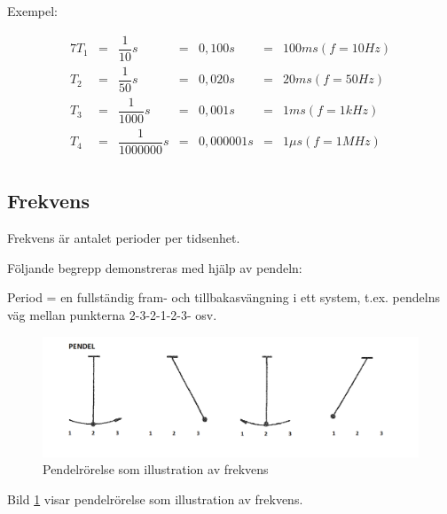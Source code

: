
Exempel:

\begin{alignat*}{7}
T_1&=&\dfrac{1}{10} \unit{s}       &=&  0,100 \unit{s}     &=& 100 ms (f = 10 \unit{Hz})\\
T_2&=&\dfrac{1}{50} \unit{s}       &=&  0,020 \unit{s}     &=& 20 ms (f = 50 \unit{Hz})\\
T_3&=&\dfrac{1}{1000} \unit{s}     &=&  0,001 \unit{s}     &=& 1 ms (f = 1 \unit{kHz})\\
T_4&=&\dfrac{1}{1000000} \unit{s}  &=&  0,000001 \unit{s}  &=& 1 \mu s (f = 1 \unit{MHz})\\
\end{alignat*}

\subsection{Frekvens}

Frekvens är antalet perioder per tidsenhet.

Följande begrepp demonstreras med hjälp av pendeln:

Period = en fullständig fram- och tillbakasvängning i ett system, t.ex.
pendelns väg mellan punkterna 2-3-2-1-2-3- osv.

\begin{figure}[ht]
	\includegraphics[width=\textwidth]{images/cropped_pdfs/bild_2_1-33.pdf}
	\caption{Pendelrörelse som illustration av frekvens}
	\label{fig:BildII1-33}
\end{figure}

Bild \ref{fig:BildII1-33} visar pendelrörelse som illustration av frekvens.

